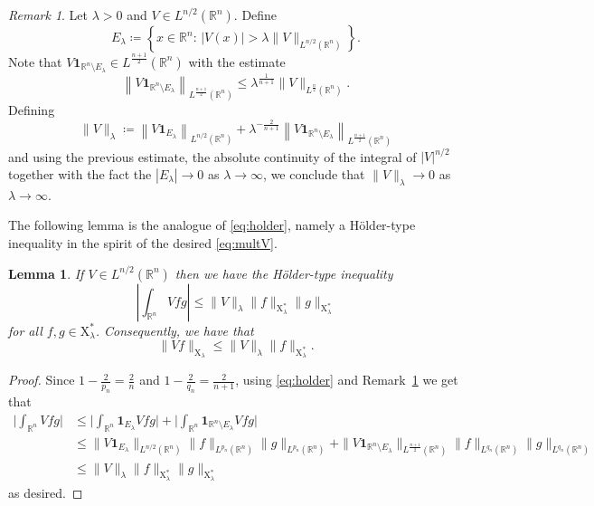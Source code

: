 \documentclass[11pt,a4paper]{amsart}
\newtheorem{lemma}[proposition]{Lemma}
\theoremstyle{remark}
\newtheorem{remark}[proposition]{Remark}
\theoremstyle{definition}
\newcommand{\R}{\mathbb{R}}
\newcommand{\X}{\mathrm{X}}
\def\ind{\mathbf 1}
\begin{document}
\begin{remark}\label{rem:endpoint_norm_for_large_V} Let $\lambda>0$ and $V\in L^{n/2}(\R^n)$. Define 
\[
E_\lambda \coloneqq \left\{ x\in\R^n:\, |V(x)| > \lambda \|V\|_{L^{n/2}(\R^n)} \right\}.
\] 
Note that $V \ind_{\R^n \setminus E_\lambda} \in L^{\frac{n+1}{2}}(\R^n)$ with the estimate
\[
\left \|V \ind_{\R^n \setminus E_\lambda} \right\|_{L^{\frac{n+1}{2}}(\R^n)} \leq \lambda^{\frac{1}{n+1}} \| V \| _{L^{\frac{n}{2}}(\R^n)} .
\]
Defining
\[
\|V\|_{\lambda}\coloneqq \left \|V\ind_{E_\lambda}\right \|_{L^{n/2}(\R^n)}+\lambda^{-\frac{2}{n+1}}\left\|V \ind_{\R^n \setminus E_\lambda} \right\|_{L^{\frac{n+1}{2}}(\R^n)}
\]
and using the previous estimate, the absolute continuity of the integral of $|V|^{n/2}$ together with the fact the $|E_\lambda|\to 0$ as $\lambda\to \infty$, we conclude that $\|V\|_\lambda \to 0$ as $\lambda\to \infty$.
\end{remark} 

The following lemma is the analogue of \eqref{eq:holder}, namely a H\"older-type inequality in the spirit of the desired \eqref{eq:multV}.

\begin{lemma}\sl \label{lem:multiplication_V_endpoint_X_norm} If $ V\in  L^{n/2}(\R^n) $ then we have the H\"older-type inequality 
\[
\left |\int_{\R^n} V f g \right| \leq \|V\|_\lambda   \| f \|_{\X^*_\lambda} \| g \|_{\X^*_\lambda} 
\]
for all $f,g\in \X^*_\lambda$.  Consequently, we have that 
\[
\| V f \|_{\X_\lambda} \leq \|V\|_\lambda \| f \|_{\X_\lambda^*}.
\]
\end{lemma}

\begin{proof}Since $1- \frac{2}{p_n} = \frac{2}{n} $ and $ 1 - \frac{2}{q_n} = \frac{2}{n+1} $, using \eqref{eq:holder} and Remark~\ref{rem:endpoint_norm_for_large_V} we get that
\[
\begin{split}
\Big| \int_{\R^n} V fg \Big| &\leq \Big| \int_{\R^n} \ind_{E_\lambda} V fg \Big| + \Big| \int_{\R^n} \ind_{\R^n \setminus E_\lambda} V fg \Big| 
\\
&\leq \| V \ind_{E_\lambda} \|_{L^{n/2}(\R^n)} \| f\|_{L^{p_n}(\R^n)} \| g\|_{L^{p_n}(\R^n)} 
+ \|V \ind_{\R^n \setminus E_\lambda} \|_{L^{\frac{n+1}{2}}(\R^n)} \| f \|_{L^{q_n}(\R^n)} \| g \|_{L^{q_n}(\R^n)} 
\\
&\leq \|V\|_\lambda\|f \|_{\X^\ast_\lambda} \| g \|_{\X^\ast_\lambda}
\end{split}
\]
as desired.
\end{proof}
\end{document}
